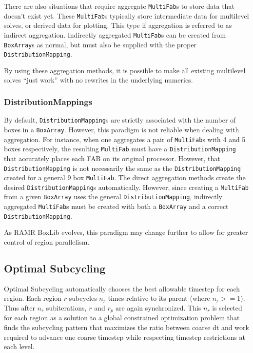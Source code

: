 \documentclass[11pt]{article}
\newcommand{\MF}{{\tt MultiFab}}
\newcommand{\BA}{{\tt BoxArray}}
\newcommand{\DM}{{\tt DistributionMapping}}
\begin{document}
There are also situations that require aggregate \MF{}s to store 
data that doesn't exist yet. These \MF{}s typically store 
intermediate data for multilevel solves, or derived data for 
plotting. This type if aggregation is referred to as indirect 
aggregation. Indirectly aggregated \MF{}s can be created from \BA{}s 
as normal, but must also be supplied with the proper \DM {}. 

By using these aggregation methods, it is possible to make all 
existing multilevel solves ``just work'' with no rewrites in the 
underlying numerics.

\subsubsection{DistributionMappings}
\label{distribution}

By default, \DM{}s are strictly associated with the number of boxes 
in a \BA{}. However, this paradigm is not reliable when 
dealing with aggregation. For instance, when one aggregates a pair of 
\MF{}s with 4 and 5 boxes respectively, the resulting \MF{} must have 
a \DM{} that accurately places each FAB on its original 
processor. However, that \DM{} is not necessarily the same as the 
\DM{} created for a general 9 box \MF{}. The direct aggregation 
methods create the desired \DM{}s automatically. However, since 
creating a \MF{} from a given \BA{} uses the general \DM{}, 
indirectly aggregated \MF{}s must be created with both a \BA{} and a 
correct \DM{}.

As RAMR BoxLib evolves, this paradigm may change further to allow for 
greater control of region parallelism.

\subsection{Optimal Subcycling}
\label{subcycling}


Optimal Subcycling automatically chooses the best allowable timestep 
for each region. Each region $r$ subcycles $n_r$ times relative to 
its parent (where $n_r >= 1$). Thus after $n_r$ subiterations, $r$ and 
$r_p$ are again synchronized. This $n_r$ is selected for each region 
as a solution to a global constrained optimization problem that finds 
the subcycling pattern that maximizes the ratio between coarse dt and 
work required to advance one coarse timestep while respecting timestep 
restrictions at each level.
\end{document}
